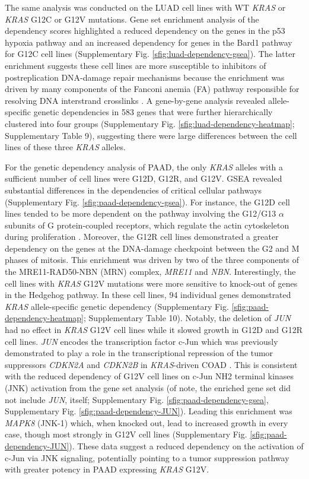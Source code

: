 \documentclass[english, 10pt, letterpaper]{article}
\newcommand{\KRAS}{\emph{KRAS}}
\begin{document}
The same analysis was conducted on the LUAD cell lines with WT \KRAS{} or \KRAS{} G12C or G12V mutations.
Gene set enrichment analysis of the dependency scores highlighted a reduced dependency on the genes in the p53 hypoxia pathway and an increased dependency for genes in the Bard1 pathway for G12C cell lines (Supplementary Fig. \ref{sfig:luad-dependency-gsea}).
The latter enrichment suggests these cell lines are more susceptible to inhibitors of postreplication DNA-damage repair mechanisms because the enrichment was driven by many components of the Fanconi anemia (FA) pathway responsible for resolving DNA interstrand crosslinks \cite{Ceccaldi2016TheFunctions.}.
A gene-by-gene analysis revealed allele-specific genetic dependencies in 583 genes that were further hierarchically clustered into four groups (Supplementary Fig. \ref{sfig:luad-dependency-heatmap}; Supplementary Table 9), suggesting there were large differences between the cell lines of these three \KRAS{} alleles.

For the genetic dependency analysis of PAAD, the only \KRAS{} alleles with a sufficient number of cell lines were G12D, G12R, and G12V.
GSEA revealed substantial differences in the dependencies of critical cellular pathways (Supplementary Fig. \ref{sfig:paad-dependency-gsea}).
For instance, the G12D cell lines tended to be more dependent on the pathway involving the G12/G13 $\alpha$ subunits of G protein-coupled receptors, which regulate the actin cytoskeleton during proliferation \cite{Worzfeld2008G12/G13-mediatedDisease., Siehler2009RegulationReceptors., Suzuki2009RegulationPathways.}.
Moreover, the G12R cell lines demonstrated a greater dependency on the genes at the DNA-damage checkpoint between the G2 and M phases of mitosis.
This enrichment was driven by two of the three components of the MRE11-RAD50-NBN (MRN) complex, \emph{MRE11} and \emph{NBN}.
Interestingly, the cell lines with \KRAS{} G12V mutations were more sensitive to knock-out of genes in the Hedgehog pathway.
In these cell lines, 94 individual genes demonstrated \KRAS{} allele-specific genetic dependency (Supplementary Fig. \ref{sfig:paad-dependency-heatmap}; Supplementary Table 10).
Notably, the deletion of \emph{JUN} had no effect in \KRAS{} G12V cell lines while it slowed growth in G12D and G12R cell lines.
\emph{JUN} encodes the transcription factor c-Jun which was previously demonstrated to play a role in the transcriptional repression of the tumor suppressors \emph{CDKN2A} and \emph{CDKN2B} in \KRAS{}-driven COAD \cite{Serra2014APhenotype.}.
This is consistent with the reduced dependency of G12V cell lines on c-Jun NH2 terminal kinases (JNK) activation from the gene set analysis (of note, the enriched gene set did not include \emph{JUN}, itself; Supplementary Fig. \ref{sfig:paad-dependency-gsea}, Supplementary Fig. \ref{sfig:paad-dependency-JUN}).
Leading this enrichment was \emph{MAPK8} (JNK-1) which, when knocked out, lead to increased growth in every case, though most strongly in G12V cell lines (Supplementary Fig. \ref{sfig:paad-dependency-JUN}).
These data suggest a reduced dependency on the activation of c-Jun via JNK signaling, potentially pointing to a tumor suppression pathway with greater potency in PAAD expressing \KRAS{} G12V.
\end{document}
